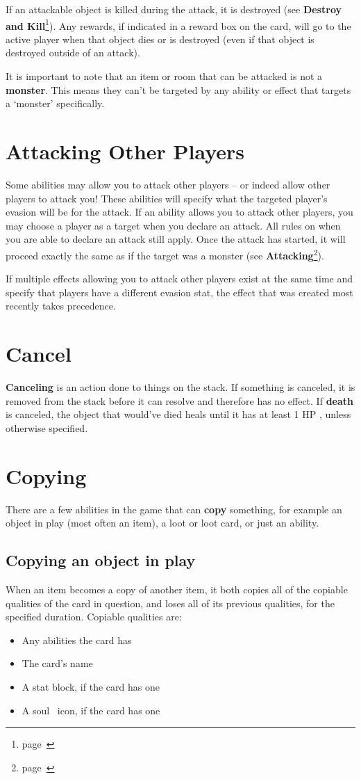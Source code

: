 \documentclass[
  fontsize=10pt,
  paper=a5,
  version=last,
  chapterprefix=true,
  bindingoffset=5mm,
  ]{scrbook}
\newcommand*{\inlineicon}[1]{%
    \raisebox{-.3\baselineskip}{%
        \smash{%
            \texttt{[image: \#1]}%
        }%
    }%
}
\newcommand{\heart}{\inlineicon{./assets/ms-heart.png}}
\newcommand{\soul}{\inlineicon{./assets/ms-soul.png}}
\begin{document}
    If an attackable object is killed during the attack, it is destroyed (see \textbf{Destroy and Kill}\footnote{page~\pageref{destroy}}). Any rewards, if indicated in a reward box on the card, will go to the active player when that object dies or is destroyed (even if that object is destroyed outside of an attack).

    It is important to note that an item or room that can be attacked is not a \textbf{monster}. This means they can’t be targeted by any ability or effect that targets a ‘monster’ specifically.

    \section{Attacking Other Players}
    Some abilities may allow you to attack other players – or indeed allow other players to attack you! These abilities will specify what the targeted player’s evasion will be for the attack. If an ability allows you to attack other players, you may choose a player as a target when you declare an attack. All rules on when you are able to declare an attack still apply. Once the attack has started, it will proceed exactly the same as if the target was a monster (see \textbf{Attacking}\footnote{page~\pageref{attacking}}).

    If multiple effects allowing you to attack other players exist at the same time and specify that players have a different evasion stat, the effect that was created most recently takes precedence.
    \section{Cancel}
    \textbf{Canceling} is an action done to things on the stack. If something is canceled, it is removed from the stack before it can resolve and therefore has no effect. If \textbf{death} is canceled, the object that would’ve died heals until it has at least 1 HP\heart, unless otherwise specified.
    \section{Copying}
    \label{copying}
    There are a few abilities in the game that can \textbf{copy} something, for example an object in play (most often an item), a loot or loot card, or just an ability.
    \subsection*{Copying an object in play}
    When an item becomes a copy of another item, it both copies all of the copiable qualities of the card in question, and loses all of its previous qualities, for the specified duration. Copiable qualities are:
    \begin{itemize}
        \item Any abilities the card has
        \item The card’s name
        \item A stat block, if the card has one
        \item A soul\soul\ icon, if the card has one
    \end{itemize}
\end{document}
